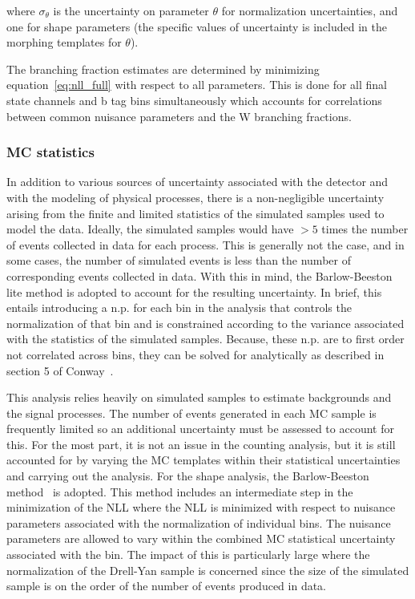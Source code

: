 where $\sigma_{\theta}$ is the uncertainty on parameter $\theta$ for
normalization uncertainties, and one for shape parameters (the specific
values of uncertainty is included in the morphing templates for
$\theta$).

The branching fraction estimates are determined by minimizing
equation~\ref{eq:nll_full} with respect to all parameters.  This is done
for all final state channels and b tag bins simultaneously which
accounts for correlations between common nuisance parameters and the W
branching fractions.

\subsubsection{MC statistics}

In addition to various sources of uncertainty associated with the
detector and with the modeling of physical processes, there is a
non-negligible uncertainty arising from the finite and limited
statistics of the simulated samples used to model the data.  Ideally,
the simulated samples would have $>5$ times the number of events
collected in data for each process.  This is generally not the case, and
in some cases, the number of simulated events is less than the number of
corresponding events collected in data.  With this in mind, the
Barlow-Beeston lite method is adopted to account for the resulting
uncertainty.  In brief, this entails introducing a n.p. for each bin in
the analysis that controls the normalization of that bin and is
constrained according to the variance associated with the statistics
of the simulated samples.  Because, these n.p. are to first order not
correlated across bins, they can be solved for analytically as described
in section 5 of Conway~\cite{Conway:2011in}.

This analysis relies heavily on simulated samples to estimate
backgrounds and the signal processes.  The number of events generated in
each MC sample is frequently limited so an additional uncertainty must
be assessed to account for this.  For the most part, it is not an issue
in the counting analysis, but it is still accounted for by varying the
MC templates within their statistical uncertainties and carrying out the
analysis.  For the shape analysis, the Barlow-Beeston
method~\cite{Amsler:2008zzb} is adopted.  This method includes an
intermediate step in the minimization of the NLL where the NLL is
minimized with respect to nuisance parameters associated with the
normalization of individual bins.  The nuisance parameters are allowed
to vary within the combined MC statistical uncertainty associated with the
bin.  The impact of this is particularly large where the normalization
of the Drell-Yan sample is concerned since the size of the simulated
sample is on the order of the number of events produced in data.



